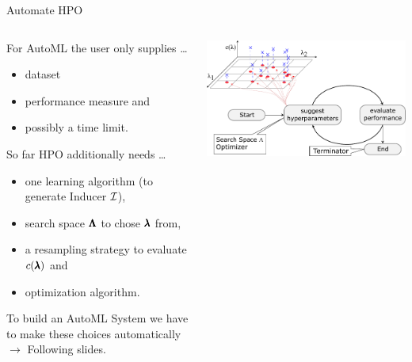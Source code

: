 \begin{frame}{Automate HPO}

  \begin{columns}
    \begin{column}{0.59\textwidth}

      For AutoML the user only supplies \ldots
      \begin{itemize}
        \item dataset
        \item performance measure and
        \item possibly a time limit.
      \end{itemize}

      So far HPO additionally needs \ldots
      \begin{itemize}
        \item one learning algorithm (to generate Inducer $\mathcal{I}$),
        \item search space $\pmb{\Lambda}$ to chose $\pmb{\lambda}$ from,
        \item a resampling strategy to evaluate $c(\pmb{\lambda})$ and
        \item optimization algorithm.
      \end{itemize}

      To build an AutoML System we have to make these choices automatically $\rightarrow$ Following slides.

    \end{column}%
    \begin{column}{0.4\textwidth}
      \begin{center}
        \includegraphics[width = \linewidth]{images/tuning.pdf}    
      \end{center}
    \end{column}
  \end{columns}

\end{frame}

